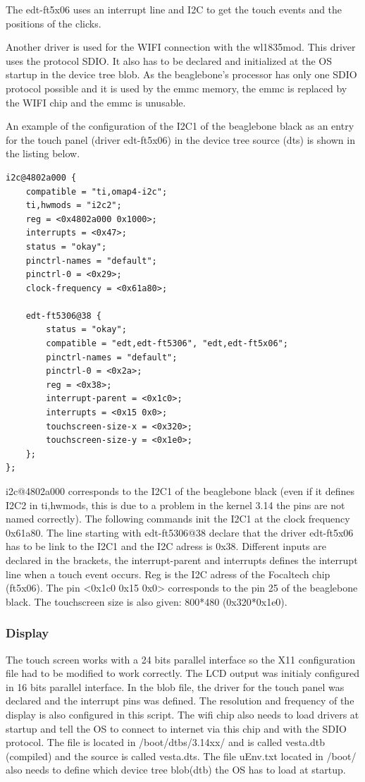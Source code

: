 The edt-ft5x06 uses an interrupt line and I2C to get the touch events and the positions of the clicks.

Another driver is used for the WIFI connection with the wl1835mod. This driver uses the protocol SDIO. It also has to be declared and initialized at the OS startup in the device tree blob. As the beaglebone's processor has only one SDIO protocol possible and it is used by the emmc memory, the emmc is replaced by the WIFI chip and the emmc is unusable.

An example of the configuration of the I2C1 of the beaglebone black as an entry for the touch panel (driver edt-ft5x06) in the device tree source (dts) is shown in the listing below.

\begin{lstlisting}
i2c@4802a000 {
	compatible = "ti,omap4-i2c";
	ti,hwmods = "i2c2";
	reg = <0x4802a000 0x1000>;
	interrupts = <0x47>;
	status = "okay";
	pinctrl-names = "default";
	pinctrl-0 = <0x29>;
	clock-frequency = <0x61a80>;

	edt-ft5306@38 {
		status = "okay";
		compatible = "edt,edt-ft5306", "edt,edt-ft5x06";
		pinctrl-names = "default";
		pinctrl-0 = <0x2a>;
		reg = <0x38>;
		interrupt-parent = <0x1c0>;
		interrupts = <0x15 0x0>;
		touchscreen-size-x = <0x320>;
		touchscreen-size-y = <0x1e0>;
	};
};
\end{lstlisting}

i2c@4802a000 corresponds to the I2C1 of the beaglebone black (even if it defines I2C2 in ti,hwmods, this is due to a problem in the kernel 3.14 the pins are not named correctly). The following commands init the I2C1 at the clock frequency 0x61a80. The line starting with edt-ft5306@38 declare that the driver edt-ft5x06 has to be link to the I2C1 and the I2C adress is 0x38. Different inputs are declared in the brackets, the interrupt-parent and interrupts defines the interrupt line when a touch event occurs. Reg is the I2C adress of the Focaltech chip (ft5x06). The pin <0x1c0 0x15 0x0> corresponds to the pin 25 of the beaglebone black. The touchscreen size is also given: 800*480 (0x320*0x1e0).

\clearpage

\subsubsection{Display}
The touch screen works with a 24 bits parallel interface so the X11 configuration file had to be modified to work correctly. The LCD output was initialy configured in 16 bits parallel interface.
In the blob file, the driver for the touch panel was declared and the interrupt pins was defined. The resolution and frequency of the display is also configured in this script. The wifi chip also needs to load drivers at startup and tell the OS to connect to internet via this chip and with the SDIO protocol.
The file is located in /boot/dtbs/3.14xx/ and is called vesta.dtb (compiled) and the source is called vesta.dts. The file uEnv.txt located in /boot/ also needs to define which device tree blob(dtb) the OS has to load at startup.

